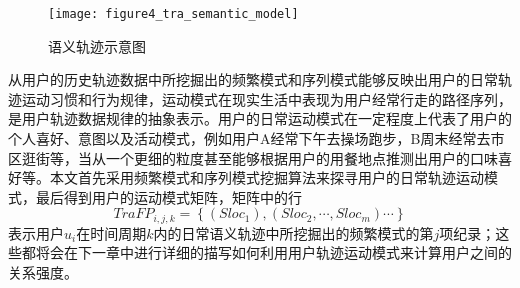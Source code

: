 \begin{figure}[htp]
\centering
\texttt{[image: figure4\_tra\_semantic\_model]}
\caption{语义轨迹示意图}
\label{fig:tra_semantic_model}
\end{figure}
\par 从用户的历史轨迹数据中所挖掘出的频繁模式和序列模式能够反映出用户的日常轨迹运动习惯和行为规律，运动模式在现实生活中表现为用户经常行走的路径序列，是用户轨迹数据规律的抽象表示。用户的日常运动模式在一定程度上代表了用户的个人喜好、意图以及活动模式，例如用户A经常下午去操场跑步，B周末经常去市区逛街等，当从一个更细的粒度甚至能够根据用户的用餐地点推测出用户的口味喜好等。本文首先采用频繁模式和序列模式挖掘算法来探寻用户的日常轨迹运动模式，最后得到用户的运动模式矩阵，矩阵中的行$$TraFP_{i,j,k}=\left \{  (Sloc_{1}),(Sloc_{2}, \cdots ,Sloc_{m})\cdots   \right \}$$ 表示用户$u_{i}$在时间周期$k$内的日常语义轨迹中所挖掘出的频繁模式的第$j$项纪录；这些都将会在下一章中进行详细的描写如何利用用户轨迹运动模式来计算用户之间的关系强度。
